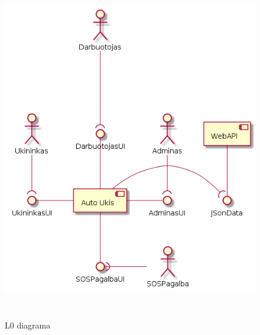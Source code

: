 \documentclass[oneside]{VUMIFPSkursinis}
\begin{document}
\begin{figure}[H]
		\centering	
	\includegraphics[width=15cm,height=15cm,keepaspectratio]{L0V2.png}
	\caption{L0 diagrama}
	\label{fig:L0V2}
\end{figure}
\end{document}
